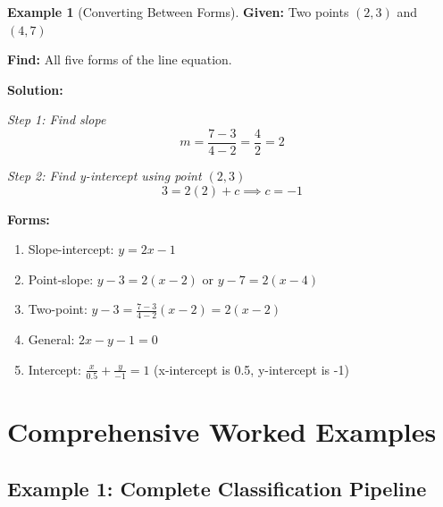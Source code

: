 \documentclass[12pt,a4paper]{article}
\theoremstyle{directpoint}
\theoremstyle{definition}
\newtheorem{example}{Example}[section]
\begin{document}
\begin{example}[Converting Between Forms]
\textbf{Given:} Two points $(2, 3)$ and $(4, 7)$

\textbf{Find:} All five forms of the line equation.

\textbf{Solution:}

\textit{Step 1: Find slope}
\begin{equation}
m = \frac{7 - 3}{4 - 2} = \frac{4}{2} = 2
\end{equation}

\textit{Step 2: Find y-intercept using point $(2, 3)$}
\begin{equation}
3 = 2(2) + c \implies c = -1
\end{equation}

\textbf{Forms:}
\begin{enumerate}
    \item Slope-intercept: $y = 2x - 1$
    \item Point-slope: $y - 3 = 2(x - 2)$ or $y - 7 = 2(x - 4)$
    \item Two-point: $y - 3 = \frac{7-3}{4-2}(x - 2) = 2(x - 2)$
    \item General: $2x - y - 1 = 0$
    \item Intercept: $\frac{x}{0.5} + \frac{y}{-1} = 1$ (x-intercept is 0.5, y-intercept is -1)
\end{enumerate}
\end{example}

\newpage

\section{Comprehensive Worked Examples}

\subsection{Example 1: Complete Classification Pipeline}
\end{document}
